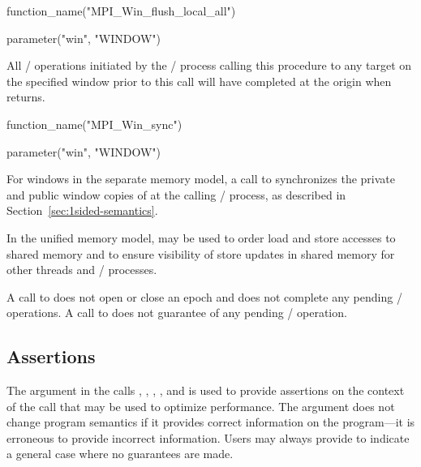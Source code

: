 %
\begin{mpi-binding}
    function_name("MPI_Win_flush_local_all")
    
    parameter("win", "WINDOW")
\end{mpi-binding}

All \RMA/ operations initiated by the \mpi/ process calling this procedure to any target on the specified window prior to this call
will have completed at the origin when
 returns.

%
\label{sec:1sided-flush:win-sync}
\begin{mpi-binding}
    function_name("MPI_Win_sync")
    
    parameter("win", "WINDOW")
\end{mpi-binding}

For windows in the separate memory model,
a call to  synchronizes the private and public window
copies of  at the calling \MPI/ process, as described in Section~\ref{sec:1sided-semantics}.

In the unified memory model,  may be used to
order load and store accesses to shared memory and to ensure visibility of store updates in shared memory
for other threads and \MPI/ processes.

A call to  does not open or close an epoch and does not complete any pending \RMA/ operations.
A call to  does not guarantee
of any pending \MPI/ operation.

\subsection{Assertions}
\label{sec:1sided-assert}

The  argument in the calls 
, ,
,
, and  is
used to provide assertions on the context of the call that may be used
to optimize performance.  The  argument does not change
program semantics if it provides correct information on the program---it
is erroneous to provide incorrect information.  Users
may always provide
 to indicate a general case where no guarantees are made.

